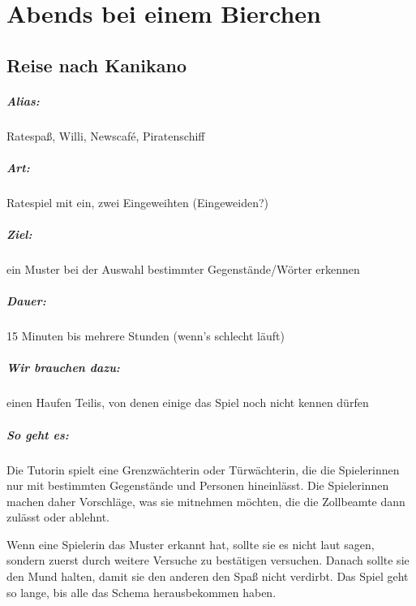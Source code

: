 \chapter{Abends bei einem Bierchen}

\section{Reise nach Kanikano}
\paragraph{Alias:} Ratespaß, Willi, Newscaf\'{e}, Piratenschiff
\paragraph{Art:} Ratespiel mit ein, zwei Eingeweihten (Eingeweiden?)
\paragraph{Ziel:} ein Muster bei der Auswahl bestimmter Gegenstände/Wörter erkennen
\paragraph{Dauer:} 15 Minuten bis mehrere Stunden (wenn's schlecht läuft)
\paragraph{Wir brauchen dazu:} einen Haufen Teilis, von denen einige das Spiel noch nicht kennen dürfen
\paragraph{So geht es:} Die Tutorin spielt eine Grenzwächterin oder Türwächterin, die die Spielerinnen nur mit bestimmten Gegenstände und Personen hineinlässt. Die Spielerinnen machen daher Vorschläge, was sie mitnehmen möchten, die die Zollbeamte dann zulässt oder ablehnt.

Wenn eine Spielerin das Muster erkannt hat, sollte sie es nicht laut sagen, sondern zuerst durch weitere Versuche zu bestätigen versuchen. Danach sollte sie den Mund halten, damit sie den anderen den Spaß nicht verdirbt. Das Spiel geht so lange, bis alle das Schema herausbekommen haben.

